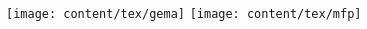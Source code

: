 \documentclass[9pt, a4paper, notitlepage]{extreport}
\begin{document}
	\maketeampage

	\begin{multicols*}{3}
	\thispagestyle{fancy}
	\setcounter{tocdepth}{0}
	\tableofcontents


	\vspace{-2mm}
	\begin{center}
		\texttt{[image: content/tex/gema]}
		\texttt{[image: content/tex/mfp]}
	\end{center}

	\end{multicols*}

\end{document}
